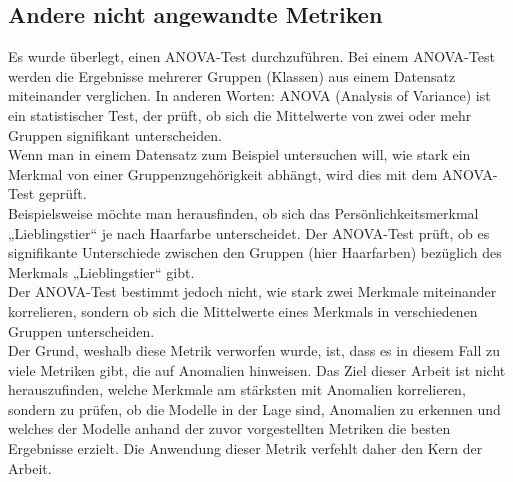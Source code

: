 \documentclass[a4paper,12pt]{article}
\begin{document}
	\subsection{Andere nicht angewandte Metriken}
	Es wurde überlegt, einen ANOVA-Test durchzuführen. Bei einem ANOVA-Test werden die Ergebnisse mehrerer Gruppen (Klassen) aus einem Datensatz miteinander verglichen. In anderen Worten:
	ANOVA (Analysis of Variance) ist ein statistischer Test, der prüft, ob sich die Mittelwerte von zwei oder mehr Gruppen signifikant unterscheiden.
	\\[0.5em]
	Wenn man in einem Datensatz zum Beispiel untersuchen will, wie stark ein Merkmal von einer Gruppenzugehörigkeit abhängt, wird dies mit dem ANOVA-Test geprüft.
	\\[0.5em]
	Beispielsweise möchte man herausfinden, ob sich das Persönlichkeitsmerkmal „Lieblingstier“ je nach Haarfarbe unterscheidet. Der ANOVA-Test prüft, ob es signifikante Unterschiede zwischen den Gruppen (hier Haarfarben) bezüglich des Merkmals „Lieblingstier“ gibt.
	\\[0.5em]
	Der ANOVA-Test bestimmt jedoch nicht, wie stark zwei Merkmale miteinander korrelieren, sondern ob sich die Mittelwerte eines Merkmals in verschiedenen Gruppen unterscheiden.
	\\[0.5em]
	Der Grund, weshalb diese Metrik verworfen wurde, ist, dass es in diesem Fall zu viele Metriken gibt, die auf Anomalien hinweisen. Das Ziel dieser Arbeit ist nicht herauszufinden, welche Merkmale am stärksten mit Anomalien korrelieren, sondern zu prüfen, ob die Modelle in der Lage sind, Anomalien zu erkennen und welches der Modelle anhand der zuvor vorgestellten Metriken die besten Ergebnisse erzielt. Die Anwendung dieser Metrik verfehlt daher den Kern der Arbeit.

	
\end{document}
